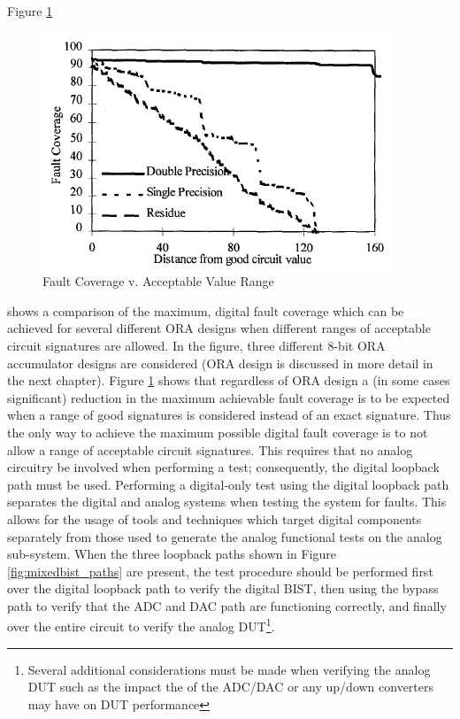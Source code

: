\documentclass[12pt]{report}
\begin{document}
Figure \ref{fig:analog-faultcvg}
\begin{figure}
	\begin{center}
		\includegraphics[scale=.7]{images/analog-fault-coverage}
	\end{center}
	\caption{Fault Coverage v. Acceptable Value Range\cite{stroud-analog}}
	\label{fig:analog-faultcvg}
\end{figure}
shows a comparison of the maximum, digital fault coverage which can be achieved for several different ORA designs when different ranges of acceptable circuit signatures are allowed.  In the figure, three different 8-bit ORA accumulator designs are considered  (ORA design is discussed in more detail in the next chapter).   Figure \ref{fig:analog-faultcvg} shows that regardless of ORA design a (in some cases significant) reduction in the maximum achievable fault coverage is to be expected when a range of good signatures is considered instead of an exact signature.  Thus the only way to achieve the maximum possible digital fault coverage is to not allow a range of acceptable circuit signatures.  This requires that no analog circuitry be involved when performing a test; consequently, the digital loopback path must be used\cite{stroud-analog}.  Performing a digital-only test using the digital loopback path separates the digital and analog systems when testing the system for faults.  This allows for the usage of tools and techniques which target digital components separately from those used to generate the analog functional tests on the analog sub-system\cite{stroud-analog}.  When the three loopback paths shown in Figure \ref{fig:mixedbist_paths} are present, the test procedure should be performed first over the digital loopback path to verify the digital BIST, then using the bypass path to verify that the ADC and DAC path are functioning correctly, and finally over the entire circuit to verify the analog DUT\cite{syschip}\cite{stroud-analog}\footnote{Several additional considerations must be made when verifying the analog DUT such as the impact the of the ADC/DAC or any up/down converters may have on DUT performance}.
\end{document}
